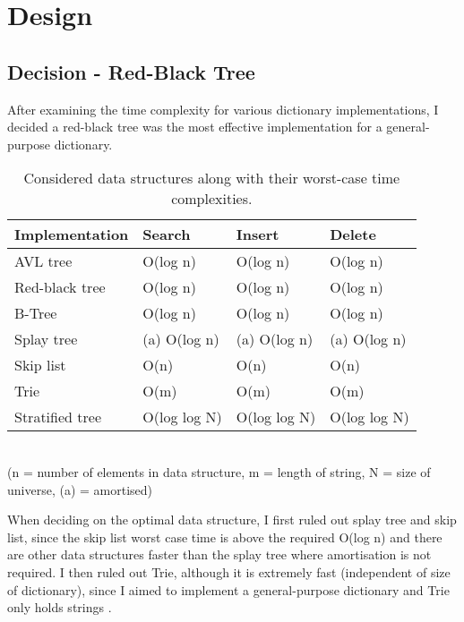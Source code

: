 \section{Design}

\subsection{Decision - Red-Black Tree}

After examining the time complexity for various dictionary implementations, I decided a red-black tree was the most effective implementation for a general-purpose dictionary.

\begin{table}[hp]
\centering
\begin{tabular}{| l | l | l | l |}
\hline
\textbf{Implementation} & \textbf{Search} & \textbf{Insert} & \textbf{Delete} \\ \hline
AVL tree & O(log n) & O(log n) & O(log n) \\ \hline
\color{red} Red-black tree & \color{red} O(log n) & \color{red} O(log n) & \color{red} O(log n) \\ \hline
B-Tree & O(log n) & O(log n) & O(log n) \\ \hline
Splay tree & (a) O(log n) & (a) O(log n) & (a) O(log n) \\ \hline
Skip list & O(n) & O(n) & O(n) \\ \hline
Trie & O(m) & O(m) & O(m) \\ \hline
Stratified tree & O(log log N) & O(log log N) & O(log log N) \\ \hline
\end{tabular}
\\{\tiny{(n = number of elements in data structure, m = length of string, N = size of universe, (a) = amortised)}}\\
\caption{Considered data structures along with their worst-case time complexities.}
\end{table}

When deciding on the optimal data structure, I first ruled out splay tree and skip list, since the skip list worst case time is above the required O(log n) and there are other data structures faster than the splay tree where amortisation is not required. I then ruled out Trie, although it is extremely fast (independent of size of dictionary), since I aimed to implement a general-purpose dictionary and Trie only holds strings \cite{trie}.

